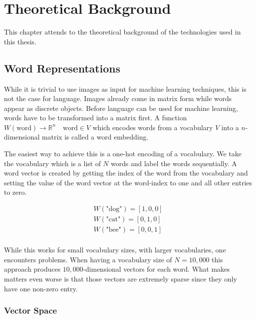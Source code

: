 \chapter{Theoretical Background}
\label{ch:theory}

This chapter attends to the theoretical background of the technologies used in this thesis.

\section{Word Representations}

While it is trivial to use images as input for machine learning techniques, this is not the case for language. Images already come in matrix form while words appear as discrete objects. Before language can be used for machine learning, words have to be transformed into a matrix first. A function $W(\text{word}) \rightarrow \mathbb{R}^n \quad \text{word} \in V$  which encodes words from a vocabulary $V$ into a $n$-dimensional matrix is called a word embedding.
\medskip

The easiest way to achieve this is a one-hot encoding of a vocabulary. We take the vocabulary which is a list of $N$ words and label the words sequentially. A word vector is created by getting the index of the word from the vocabulary and setting the value of the word vector at the word-index to one and all other entries to zero.

\begin{equation*}
    \begin{aligned}
        W(\text{"dog"}) = [1, 0, 0] \\
        W(\text{"cat"}) = [0, 1, 0] \\
        W(\text{"bee"}) = [0, 0, 1] \\
    \end{aligned}
\end{equation*}


While this works for small vocabulary sizes, with larger vocabularies, one encounters problems. When having a vocabulary size of $N=10,000$ this approach produces $10,000$-dimensional vectors for each word. What makes matters even worse is that those vectors are extremely sparse since they only have one non-zero entry.
\medskip

\subsection{Vector Space}
\label{sec:03_vectorSpace}


